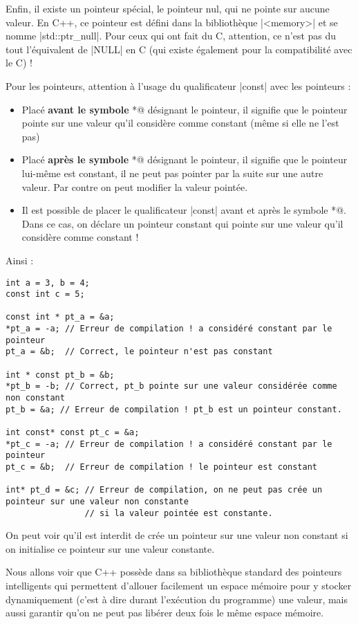 Enfin, il existe un pointeur spécial, le pointeur nul, qui ne pointe sur aucune valeur. En C++, ce pointeur est défini dans la bibliothèque |<memory>| et se nomme |std::ptr_null|. Pour ceux qui ont fait du C, attention, ce n'est pas du tout l'équivalent de |NULL| en C (qui existe également pour la compatibilité avec le C) !

Pour les pointeurs, attention à l'usage du qualificateur |const| avec les pointeurs :
\begin{itemize}
  \item Placé \textbf{avant le symbole} \verb@*@ désignant le pointeur, il signifie que le pointeur pointe sur une valeur
        qu'il considère comme constant (même si elle ne l'est pas)
  \item Placé \textbf{après le symbole} \verb@*@ désignant le pointeur, il signifie que le pointeur lui-même est constant,
        il ne peut pas pointer par la suite sur une autre valeur. Par contre on peut modifier la valeur pointée.
  \item Il est possible de placer le qualificateur |const| avant et après le symbole \verb@*@. Dans ce cas, on déclare
        un pointeur constant qui pointe sur une valeur qu'il considère comme constant !
\end{itemize}

Ainsi :

\begin{lstlisting}
int a = 3, b = 4;
const int c = 5;

const int * pt_a = &a;
*pt_a = -a; // Erreur de compilation ! a considéré constant par le pointeur
pt_a = &b;  // Correct, le pointeur n'est pas constant

int * const pt_b = &b;
*pt_b = -b; // Correct, pt_b pointe sur une valeur considérée comme non constant
pt_b = &a; // Erreur de compilation ! pt_b est un pointeur constant.

int const* const pt_c = &a;
*pt_c = -a; // Erreur de compilation ! a considéré constant par le pointeur
pt_c = &b;  // Erreur de compilation ! le pointeur est constant

int* pt_d = &c; // Erreur de compilation, on ne peut pas crée un pointeur sur une valeur non constante
                // si la valeur pointée est constante. 
\end{lstlisting}

On peut voir qu'il est interdit de crée un pointeur sur une valeur non constant si on initialise ce pointeur sur une valeur constante. 

Nous allons voir que C++ possède dans sa bibliothèque standard des pointeurs intelligents qui permettent d'allouer facilement un espace mémoire pour y stocker dynamiquement (c'est à dire durant l'exécution du programme) une valeur, mais aussi garantir qu'on ne peut pas libérer deux fois le même espace mémoire.

